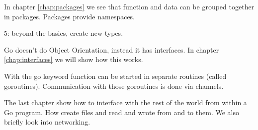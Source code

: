 In chapter \ref{chap:packages} we see that function and data can be grouped together
in packages. Packages provide namespaces.

5: beyond the basics, create new types.

Go doesn't do Object Orientation, instead it has interfaces. In chapter \ref{chap:interfaces}
we will show how this works.

With the go keyword function can be started in separate routines (called goroutines). 
Communication with those goroutines is done via channels.

The last chapter show how to interface with the rest of the world from within 
a Go program. How create files and read and wrote from and to them. We also briefly
look into networking.
